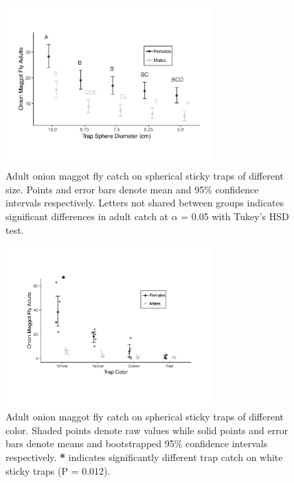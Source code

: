 \documentclass[alpha-refs]{wiley-article}
\begin{document}
\begin{figure}[bt]
\centering
\includegraphics[width = 8cm]{figures/publication/figure-2.pdf}
\caption{Adult onion maggot fly catch on spherical sticky traps of different size.  Points and error bars denote mean and 95\% confidence intervals respectively.  Letters not shared between groups indicates significant differences in adult catch at $\alpha$ = 0.05 with Tukey's HSD test.}
\label{fig:figure2}
\end{figure}

\begin{figure}[bt]
\centering
\includegraphics[width = 8cm]{figures/publication/figure-3.pdf}
\caption{Adult onion maggot fly catch on spherical sticky traps of different color.  Shaded points denote raw values while solid points and error bars denote means and bootstrapped 95\% confidence intervals respectively.  \textbf{*} indicates significantly different trap catch on white sticky traps (P = 0.012).}
\label{fig:figure3}
\end{figure}
\end{document}
